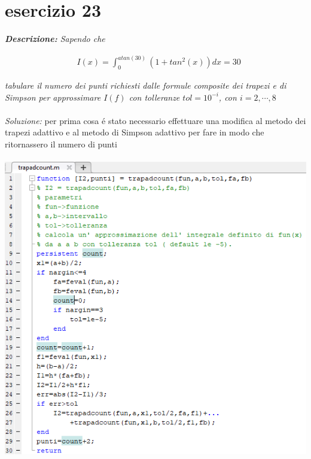\section{esercizio 23}
\textit{\textbf{Descrizione:}  Sapendo che}

\begin{equation}
  \begin{aligned}
      & I(x) =\int_{0}^{atan(30)}(1+tan^{2}(x))dx = 30
  \end{aligned}
\end{equation}

\noindent\textit{tabulare il numero dei punti richiesti dalle formule composite dei trapezi e di Simpson per approssimare $I(f)$ con tolleranze $tol=10^{-i}$, con $i = 2,\cdots,8$}
\\~\\
\noindent\emph{Soluzione: }\newline
per prima cosa \'e stato necessario effettuare una modifica al metodo dei trapezi adattivo e al metodo di Simpson adattivo per fare in modo che ritornassero \newline
il numero di punti\\~\\
\includegraphics[width=1.3\linewidth]{img/trapadcount}
